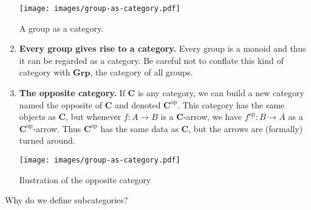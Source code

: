 \begin{example}
\begin{enumerate}[label=\arabic*.]
    \begin{marginfigure}[3\baselineskip]
        \captionsetup{type=figure}
        \centering
        \texttt{[image: images/group-as-category.pdf]}\vspace{\baselineskip}
        \caption{A group as a category.}
    \end{marginfigure}
    \item \textbf{Every group gives rise to a  category.}
    Every group is a monoid and thus it can be regarded as a category.
    Be careful not to conflate this  kind of category   with \(\mathbf{Grp}\), the category of all groups.

    \item \textbf{The opposite category.} If \(\mathbf{C}\) is any category, we can build a new category named the opposite of \(\mathbf{C}\) and denoted \(\mathbf{C}^{\text{op}}\). This category has the same objects as \(\mathbf{C}\), but whenever \(f\colon A\to B\) is a \(\mathbf{C}\)-arrow, we have  \(f^{\text{op}}\colon B\to A\) as a \(\mathbf{C}^{\text{op}}\)-arrow. 
    Thus \(\mathbf{C}^{\text{op}}\) has the same data as \(\mathbf{C}\), but the arrows are (formally) turned around.
    \begin{marginfigure}[3\baselineskip]
        \captionsetup{type=figure}
        \centering
        \texttt{[image: images/group-as-category.pdf]}\vspace{\baselineskip}
        \caption{Ilustration of the opposite category}
    \end{marginfigure}
\end{enumerate}
\end{example}

Why do we define subcategories?

